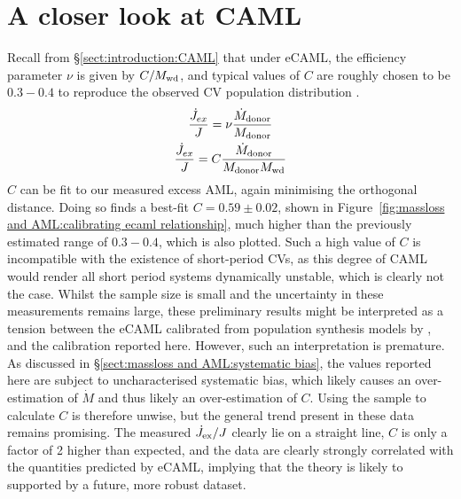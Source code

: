 \section{A closer look at CAML}
Recall from \S\ref{sect:introduction:CAML} that under eCAML, the efficiency parameter $\nu$ is given by $C/M_{\rm wd}$, and typical values of $C$ are roughly chosen to be $0.3 - 0.4$ to reproduce the observed CV population distribution \citep{Schreiber2016}.
\begin{gather}
    \frac{\dot J_{ex}}{J} = \nu \frac{\dot M_{\rm donor}}{M_{\rm donor}} \label{eqn:caml general} \\
    \frac{\dot J_{ex}}{J} = C \frac{\dot M_{\rm donor}}{M_{\rm donor} M_{\rm wd}} \label{eqn:ecaml}
\end{gather}
$C$ can be fit to our measured excess AML, again minimising the orthogonal distance.
Doing so finds a best-fit $C = 0.59\pm0.02$, shown in Figure~\ref{fig:massloss and AML:calibrating ecaml relationship}, much higher than the previously estimated range of $0.3 - 0.4$, which is also plotted.
Such a high value of $C$ is incompatible with the existence of short-period CVs, as this degree of CAML would render all short period systems dynamically unstable, which is clearly not the case. Whilst the sample size is small and the uncertainty in these measurements remains large, these preliminary results might be interpreted as a tension between the eCAML calibrated from population synthesis models by \citet{Schreiber2016}, and the calibration reported here.
However, such an interpretation is premature. As discussed in \S\ref{sect:massloss and AML:systematic bias}, the values reported here are subject to uncharacterised systematic bias, which likely causes an over-estimation of $\dot M$ and thus likely an over-estimation of $C$. Using the sample to calculate $C$ is therefore unwise, but the general trend present in these data remains promising. The measured $\dot J_{\rm ex} / J$ clearly lie on a straight line, $C$ is only a factor of 2 higher than expected, and the data are clearly strongly correlated with the quantities predicted by eCAML, implying that the theory is likely to supported by a future, more robust dataset.


